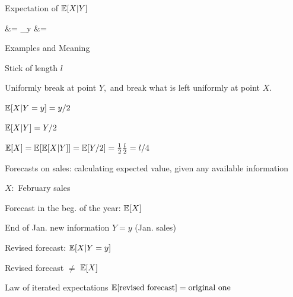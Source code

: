 \documentclass[fleqn,aspectratio=169]{beamer}
\begin{document}
\begin{frame}{Expectation of $\mathbb{E}[ X|Y ]$}

\plitemsep 0.1in



\aleq
{
 &= \sum_{y}  \py \cr
&= 
}
\end{frame}

\begin{frame}{Examples and Meaning}

{
\plitemsep 0.1in


\bci 
\item<2-> Stick of length $l$
\item<2-> Uniformly break at point $Y,$ and break what is left uniformly at point $X.$

\item<3-> $\mathbb{E}[ X | Y=y ] = y/2$ 

\item<3-> $\mathbb{E}[ X | Y ] = Y/2$ 

\item<4-> $\mathbb{E}[ X ] = \mathbb{E}[ \mathbb{E}[ X|Y ] ] = \mathbb{E}[ Y/2 ]=\frac{1}{2}\frac{l}{2} = l/4$
\eci
}
{
\plitemsep 0.1in


\bci 
\item<5-> Forecasts on sales: calculating expected value, given any available information

\item<6-> $X:$ February sales

\item<6-> Forecast in the beg. of the year: $\mathbb{E}[ X ]$

\item<7-> End of Jan. new information $Y=y$ (Jan. sales)

Revised forecast: $\mathbb{E}[ X|Y=y ]$

Revised forecast $\neq$ $\mathbb{E}[ X ]$

\item<8-> Law of iterated expectations
$\mathbb{E}[ \text{revised forecast} ] = \text{original one}$

\eci

}
\end{frame}
\end{document}
